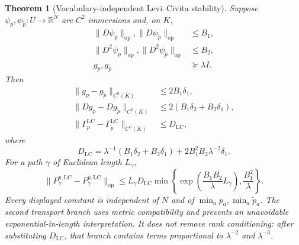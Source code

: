 \documentclass[11pt]{article}
\newtheorem{theorem}{Theorem}[section]
\theoremstyle{definition}
\theoremstyle{remark}
\newcommand{\R}{\mathbb{R}}
\newcommand{\LC}{\mathrm{LC}}
\newcommand{\op}{\mathrm{op}}
\begin{document}
\begin{theorem}[Vocabulary-independent Levi--Civita stability]\label{thm:sqrt-lc-stability}
Suppose $\psi_p,\psi_{\widetilde p}:U\to\R^N$ are $C^2$ immersions and, on $K$,
\begin{align}
    \|D\psi_p\|_{\op},\|D\psi_{\widetilde p}\|_{\op}&\le B_1,\nonumber\\
    \|D^2\psi_p\|_{\op},\|D^2\psi_{\widetilde p}\|_{\op}&\le B_2,\label{eq:sqrt-regularity}\\
    g_p,g_{\widetilde p}&\succeq\lambda I.\nonumber
\end{align}
Then
\begin{align}
    \|g_p-g_{\widetilde p}\|_{C^0(K)}
    &\le 2B_1\delta_1,\label{eq:sqrt-metric-bound}\\
    \|Dg_p-Dg_{\widetilde p}\|_{C^0(K)}
    &\le2(B_1\delta_2+B_2\delta_1),\label{eq:sqrt-metric-derivative-bound}\\
    \|\Gamma_p^{\LC}-\Gamma_{\widetilde p}^{\LC}\|_{C^0(K)}
    &\le D_{\LC},\label{eq:sqrt-connection-bound}
\end{align}
where
\begin{equation}
    D_{\LC}
    =\lambda^{-1}(B_1\delta_2+B_2\delta_1)
    +2B_1^2B_2\lambda^{-2}\delta_1.
    \label{eq:dlc}
\end{equation}
For a path $\gamma$ of Euclidean length $L_\gamma$,
\begin{equation}
    \|P_\gamma^{p,\LC}-P_\gamma^{\widetilde p,\LC}\|_{\op}
    \le L_\gamma D_{\LC}
    \min\!\left\{
        \exp\!\left(\frac{B_1B_2}{\lambda}L_\gamma\right),
        \frac{B_1^2}{\lambda}
    \right\}.
    \label{eq:sqrt-transport-bound}
\end{equation}
Every displayed constant is independent of $N$ and of $\min_a p_a,\min_a\widetilde p_a$. The second transport branch uses metric compatibility and prevents an unavoidable exponential-in-length interpretation. It does not remove rank conditioning: after substituting $D_{\LC}$, that branch contains terms proportional to $\lambda^{-2}$ and $\lambda^{-3}$.
\end{theorem}
\end{document}
